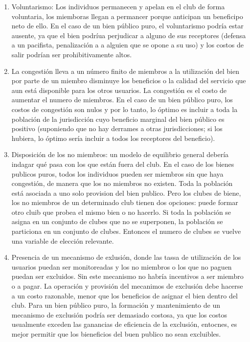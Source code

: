 \begin{enumerate}
\begin{enumerate}
	 \item Voluntarismo: Los individuos permanecen y apelan en el club de forma voluntaria, los miemboras llegan a permancer porque anticipan un beneficipo neto de ello. En el caso de un bien público puro, el voluntarismo podría estar ausente, ya que el bien podríua perjudicar a alguno de sus receptores (defensa a un pacifista, penalización a a alguien que se opone a su uso) y los costos de salir podrían ser prohibitivamente altos.
	 \item La congestión lleva a un número finito de miembros a la utilización del bien por parte de un miembro disminuye los beneficios o la calidad del servicio que aun está disponible para los otros usuarios. La congestión es el costo de aumentar el numero de miembros.
	En el caso de un bien público puro, los costos de congestión son nulos y por lo tanto, lo óptimo es incluir a toda la población de la jurisdicción cuyo beneficio marginal del bien público es positivo (suponiendo que no hay derrames a otras jurisdicciones; si los hubiera, lo óptimo sería incluir a todos los receptores del beneficio).
	 \item Disposición de los no miembros: un modelo de equilibrio general debería indagar qué pasa con los que están fuera del club. En el caso de los bienes publicos puros, todos los individuos pueden ser miembros sin que haya congestión, de manera que los no miembros no existen. Toda la población está asociada a uno solo provision del bien publico. Pero los clubes de biene, los no miembros de un determinado club tienen dos opciones: puede formar otro cluib que probea el mismo bien o no hacerlo. Si toda la población se asigna en un conjunto de clubes que no se superponen, la población se particiona en un conjunto de clubes. Entonces el numero de clubes se vuelve una variable de elección relevante.
	\item Presencia de un mecanismo de exlusión, donde las tassa de utilización de los usuarios puedan ser monitoreadas y los no miembros o los que no paguen puedan ser excluidos. Sin este mecanismo no habría incentivos a ser miembro o  a pagar. La operación y provisión del mecanimos de exclusión debe hacerse a un costo razonable, menor que los beneficios de asignar el bien dentro del club. Para un bien público puro, la formación y mantenimiento de un mecanismo de exclusión podría ser demasiado costosa, ya que los costos usualmente exceden las ganancias de eficiencia de la exclusión, entocnes, es mejor permitir que los bieneficios del buen publico no sean excluibles.

\end{enumerate}
\end{enumerate}
